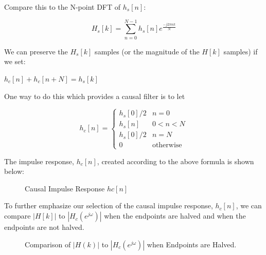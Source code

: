 \documentclass[fleqn]{article}
\begin{document}
\begin{enumerate}
\begin{enumerate}[nolistsep]
			Compare this to the N-point DFT of $h_s[n]$:
			
			\begin{equation*}
				H_s[k] = \sum_{n=0}^{N-1}{h_s[n]e^{\frac{-j2{\pi}nk}{N}}}
			\end{equation*}
			
			We can preserve the $H_s[k]$ samples (or the magnitude of the $H[k]$ samples) if we set:
			
			$h_c[n] + h_c[n+N] = h_s[k]$
			
			One way to do this which provides a causal filter is to let
			
			\begin{equation*}
				h_c[n] = \begin{cases}
					h_s[0]/2 & n = 0\\
					h_s[n]   & 0 < n < N\\
					h_s[0]/2 & n = N\\
					0		 & \text{otherwise}
				\end{cases}
			\end{equation*}
			
			The impulse response, $h_c[n]$, created according to the above formula is shown below:
			
			\begin{figure}[H]
				\centerline{}
				\caption{Causal Impulse Response $hc[n]$}
			\end{figure}
			
			To further emphasize our selection of the causal impulse response, $h_c[n]$, we can compare $|H[k]|$ to $|H_c(e^{j\omega})|$ when the endpoints are halved and when the endpoints are not halved.
			
			\begin{figure}[H]
				\centerline{}
				\caption{\doublespacing Comparison of $|H(k)|$ to $|H_c(e^{j\omega})|$ when Endpoints are Halved.}
				\label{freq_response_halved_endpoints}
			\end{figure}
			

\end{enumerate}
\end{enumerate}
\end{document}
